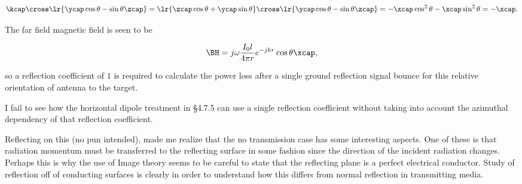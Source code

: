 \begin{dmath}\label{eqn:chapter4Notes:740}
\kcap \cross
\lr{ \ycap \cos\theta - \sin\theta \zcap }
=
\lr{ \zcap \cos\theta + \ycap \sin\theta } \cross
\lr{ \ycap \cos\theta - \sin\theta \zcap }
=
-\xcap \cos^2 \theta - \xcap \sin^2\theta
= -\xcap.
\end{dmath}

The far field magnetic field is seen to be

\begin{dmath}\label{eqn:chapter4Notes:721}
\BH = 
j \omega \frac{I_0 l}{4 \pi r} e^{-j k r}
\cos\theta \xcap,
\end{dmath}

so a reflection coefficient of \( 1 \) is required to calculate the power loss after a single ground reflection signal bounce for this relative orientation of antenna to the target.

I fail to see how the horizontal dipole treatment in \S 4.7.5 can use a single reflection coefficient without taking into account the azimuthal dependency of that reflection coefficient.

Reflecting on this (no pun intended), made me realize that the no transmission case has some interesting aspects.  One of these is that radiation momentum must be transferred to the reflecting surface in some fashion since the direction of the incident radiation changes.  Perhaps this is why the use of Image theory seems to be careful to state that the reflecting plane is a perfect electrical conductor.  Study of reflection off of conducting surfaces is clearly in order to understand how this differs from normal reflection in transmitting media.

